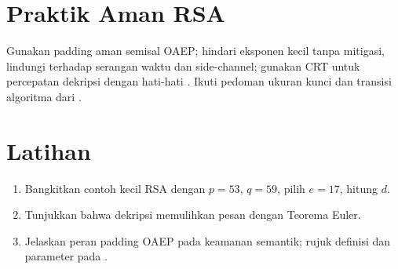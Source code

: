 \documentclass[../main.tex]{subfiles}
\begin{document}
\section{Praktik Aman RSA}
Gunakan padding aman semisal OAEP; hindari eksponen kecil tanpa mitigasi, lindungi terhadap serangan waktu dan side-channel; gunakan CRT untuk percepatan dekripsi dengan hati-hati \citep{katzlindell,menezes}. Ikuti pedoman ukuran kunci dan transisi algoritma dari \citep{nist_sp_800_131a}.

\section{Latihan}
\begin{enumerate}
  \item Bangkitkan contoh kecil RSA dengan \(p=53\), \(q=59\), pilih \(e=17\), hitung \(d\).
  \item Tunjukkan bahwa dekripsi memulihkan pesan dengan Teorema Euler.
  \item Jelaskan peran padding OAEP pada keamanan semantik; rujuk definisi dan parameter pada \citep{rfc8017}.
\end{enumerate}
\end{document}
